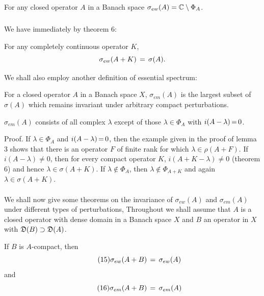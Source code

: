 \documentclass[11pt,twoside]{article}
\begin{document}
\begin{definition}
For any closed operator $A$ in a Banach space
$\sigma_{ew}(A) = \C \setminus \Phi_A$.
\end{definition}

\subparagraph*{}
We have immediately by theorem 6:

\begin{theorem1} %
For any completely continuous operator $K$,
\[
\sigma_{ew}(A+K) \= \sigma(A).
\]
\end{theorem1}

We shall also employ another definition of essential spectrum:

\begin{definition}
For a closed operator $A$ in a Banach space $X$,
$\sigma_{em}(A)$ is the largest subset of $\sigma(A)$
which remains invariant under arbitrary compact perturbations.
\end{definition}

\begin{theorem1} %
$\sigma_{em}(A)$ consists of all complex $\lambda$
except of those $\lambda \in \Phi_A$ with $i(A- \lambda) \eq 0$.
\end{theorem1}

Proof.
If $\lambda \in \Phi_A$ and $i(A-\lambda) \eq 0$,
then the example given in the proof of lemma 3 shows
that there is an operator $F$ of
finite rank for which $\lambda \in \rho(A + F)$.
If $i(A - \lambda) \neq 0$,
then for every compact operator $K$, $i(A+K-\lambda) \neq 0$ (theorem 6)
and hence $\lambda \in \sigma(A + K)$.
If $\lambda \notin \Phi_A$,
then $\lambda \notin \Phi_{A+K}$ and again $\lambda \in \sigma(A+K)$.

\paragraph*{}
We shall now give some theorems on the invariance of
$\sigma_{ew}(A)$ and $\sigma_{em}(A)$ under different types of perturbations,
Throughout we shall assume that $A$ is a closed operator
with dense domain in a Banach space $X$
and $B$ an operator in $X$ with $\domain{B} \supset \domain{A}$.

\begin{theorem1} %
If $B$ is $A$-compact, then
\begin{equation}\tag{15}
\sigma_{ew}(A+B) \= \sigma_{ew}(A)
\end{equation}
and
\begin{equation}\tag{16}
\sigma_{em}(A+B) \= \sigma_{em}(A)
\end{equation}
\end{theorem1}
\end{document}
